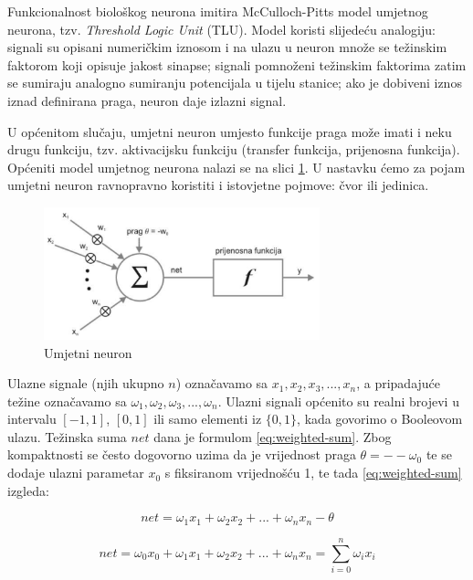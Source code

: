 Funkcionalnost biološkog neurona imitira McCulloch-Pitts model umjetnog neurona, tzv. \textit{Threshold Logic Unit} (TLU). Model koristi slijedeću analogiju: signali su opisani numeričkim iznosom i na ulazu u neuron množe se težinskim faktorom koji opisuje jakost sinapse; signali pomnoženi težinskim faktorima zatim se sumiraju analogno sumiranju potencijala u tijelu stanice; ako je dobiveni iznos iznad definirana praga, neuron daje izlazni signal. 

U općenitom slučaju, umjetni neuron umjesto funkcije praga može imati i neku drugu funkciju, tzv. aktivacijsku funkciju (transfer funkcija, prijenosna funkcija). Općeniti model umjetnog neurona nalazi se na slici \ref{img:artificial-neuron}. U nastavku ćemo za pojam umjetni neuron ravnopravno koristiti i istovjetne pojmove: čvor ili jedinica. 

\begin{figure}[htb]
\centering
\includegraphics[width=8cm]{img/ArtificialNeuron.png}
\caption{Umjetni neuron}
\label{img:artificial-neuron}
\end{figure}

Ulazne signale (njih ukupno $n$) označavamo sa $x_1, x_2, x_3, ... , x_n$, a pripadajuće težine označavamo sa $\omega_1, \omega_2, \omega_3,..., \omega_n$.
Ulazni signali općenito su realni brojevi u intervalu $[-1,1]$, $[0,1]$ ili samo elementi iz $\{0,1\}$, kada govorimo o Booleovom ulazu. Težinska suma $net$ dana je formulom \ref{eq:weighted-sum}. Zbog kompaktnosti se često dogovorno uzima da je vrijednost praga $\theta = --\omega_0$ te se dodaje ulazni parametar $x_0$ s fiksiranom vrijednošću 1, te tada \ref{eq:weighted-sum} izgleda:

\begin{equation}
net = \omega_1 x_1 + \omega_2 x_2 + ... + \omega_n x_n - \theta
\label{eq:weighted-sum}
\end{equation}

\begin{equation}
net = \omega_0 x_0 + \omega_1 x_1 + \omega_2 x_2 + ... + \omega_n x_n = \sum_{i=0}^{n} \omega_i x_i
\label{eq:weighted-sum_2}
\end{equation}

